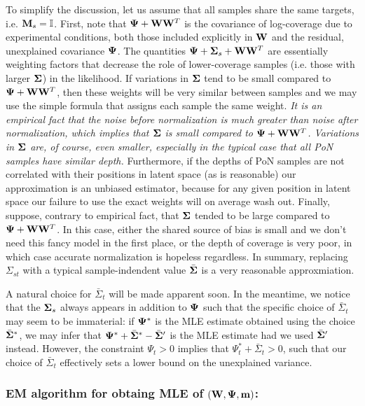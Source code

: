 \documentclass[nofootinbib,amssymb,amsmath]{revtex4}
\newcommand{\vm}{{\bf m}}
\newcommand{\vM}{{\bf M}}
\newcommand{\vW}{{\bf W}}
\newcommand{\vPsi}{{\bf \Psi}}
\newcommand{\vSigma}{{\bf \Sigma}}
\begin{document}
%
To simplify the discussion, let us assume that all samples share the same targets, i.e. $\vM_s = \mathbb{I}$.
First, note that $\vPsi + \vW \vW^T$ is the covariance of log-coverage due to experimental conditions, both those included explicitly in $\vW$ and the residual, unexplained covariance $\vPsi$. The quantities $\vPsi + \vSigma_s + \vW \vW^T$ are essentially weighting factors that decrease the role of lower-coverage samples (i.e. those with larger $\vSigma$) in the likelihood. If variations in $\vSigma$ tend to be small compared to $\vPsi + \vW \vW^T$, then these weights will be very similar between samples and we may use the simple formula that assigns each sample the same weight. {\em It is an empirical fact that the noise before normalization is much greater than noise after normalization, which implies that $\vSigma$ is small compared to $\vPsi + \vW \vW^T$. Variations in $\vSigma$ are, of course, even smaller, especially in the typical case that all PoN samples have similar depth.} Furthermore, if the depths of PoN samples are not correlated with their positions in latent space (as is reasonable) our approximation is an unbiased estimator, because for any given position in latent space our failure to use the exact weights will on average wash out.  Finally, suppose, contrary to empirical fact, that $\vSigma$ tended to be large compared to $\vPsi + \vW \vW^T$. In this case, either the shared source of bias is small and we don't need this fancy model in the first place, or the depth of coverage is very poor, in which case accurate normalization is hopeless regardless. In summary, replacing $\Sigma_{st}$ with a typical sample-indendent value $\bar{\vSigma}$ is a very reasonable approxmiation.

A natural choice for $\bar{\Sigma}_t$ will be made apparent soon. In the meantime, we notice that the $\vSigma_s$ always appears in addition to $\vPsi$ such that the specific choice of $\bar{\Sigma}_t$ may seem to be immaterial: if $\vPsi^*$ is the MLE estimate obtained using the choice $\bar{\vSigma}^*$, we may infer that $\vPsi^* + \bar{\vSigma}^* - \bar{\vSigma}'$ is the MLE estimate had we used $\bar{\vSigma}'$ instead. However, the constraint $\Psi_t > 0$ implies that $\Psi^*_t + \bar{\Sigma}_t > 0$, such that our choice of $\bar{\Sigma}_t$ effectively sets a lower bound on the unexplained variance.\\


\subsubsection{EM algorithm for obtaing MLE of $(\vW, \vPsi, \vm)$:}
\end{document}
